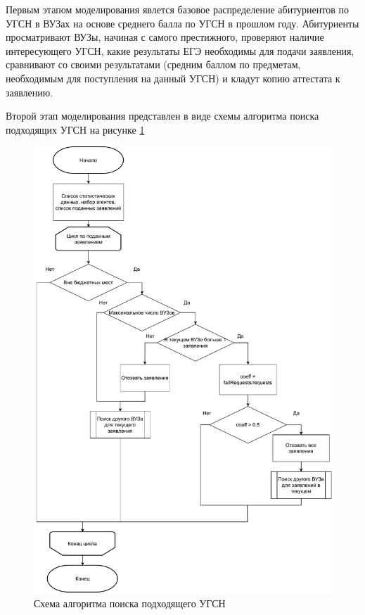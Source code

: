 Первым этапом моделирования явлется базовое распределение абитуриентов по УГСН в ВУЗах на основе среднего балла по УГСН в прошлом году. Абитуриенты просматривают ВУЗы, начиная с самого престижного, проверяют наличие интересующего УГСН, какие результаты ЕГЭ необходимы для подачи заявления, сравнивают со своими результатами (средним баллом по предметам, необходимым для поступления на данный УГСН) и кладут копию аттестата к заявлению.

Второй этап моделирования представлен в виде схемы алгоритма поиска подходящих УГСН на рисунке \ref{scheme:find}

\begin{figure}[hbtp]
	\centering
	\includegraphics[scale=0.6]{idef0/find.pdf}
	\caption{Схема алгоритма поиска подходящего УГСН}
	\label{scheme:find}
\end{figure}


